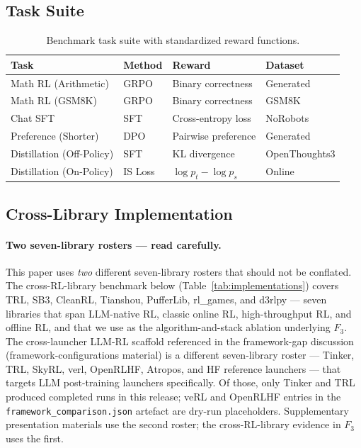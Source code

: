 \documentclass{article}  \usepackage[preprint,nonatbib]{neurips_2026} \usepackage[numbers]{natbib}
\begin{document}
\subsection{Task Suite}

\begin{table}[htbp]
\centering
\caption{Benchmark task suite with standardized reward functions.}
\label{tab:tasks}
\begin{tabular}{llll}
\toprule
\textbf{Task} & \textbf{Method} & \textbf{Reward} & \textbf{Dataset} \\
\midrule
Math RL (Arithmetic) & GRPO & Binary correctness & Generated \\
Math RL (GSM8K) & GRPO & Binary correctness & GSM8K \\
Chat SFT & SFT & Cross-entropy loss & NoRobots \\
Preference (Shorter) & DPO & Pairwise preference & Generated \\
Distillation (Off-Policy) & SFT & KL divergence & OpenThoughts3 \\
Distillation (On-Policy) & IS Loss & $\log p_t - \log p_s$ & Online \\
\bottomrule
\end{tabular}
\end{table}

\subsection{Cross-Library Implementation}

\paragraph{Two seven-library rosters --- read carefully.}
This paper uses \emph{two} different seven-library rosters that
should not be conflated. The cross-RL-library benchmark below
(Table~\ref{tab:implementations}) covers TRL, SB3, CleanRL, Tianshou,
PufferLib, rl\_games, and d3rlpy --- seven libraries that span
LLM-native RL, classic online RL, high-throughput RL, and offline RL,
and that we use as the algorithm-and-stack ablation underlying $F_3$.
The cross-launcher LLM-RL scaffold referenced in the framework-gap
discussion (framework-configurations material) is a different seven-library
roster --- Tinker, TRL, SkyRL, verl, OpenRLHF, Atropos, and HF
reference launchers --- that targets LLM post-training launchers
specifically. Of those, only Tinker and TRL produced completed
runs in this release; veRL and OpenRLHF entries in the
\texttt{framework\_comparison.json} artefact are dry-run
placeholders. Supplementary presentation materials use the second roster; the
cross-RL-library evidence in $F_3$ uses the first.
\end{document}

